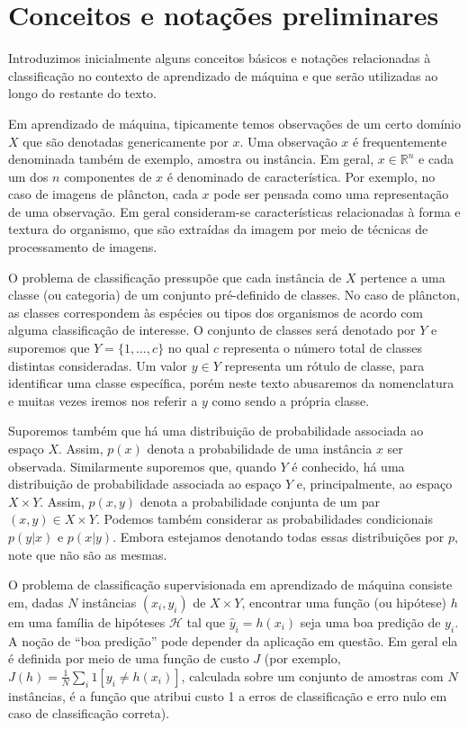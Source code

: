 {\color{black}
\section{Conceitos e notações preliminares}

Introduzimos inicialmente alguns conceitos básicos e notações relacionadas à classificação no contexto de aprendizado de máquina e que serão utilizadas ao longo do restante do texto.

Em aprendizado de máquina, tipicamente temos observações de um certo domínio $X$ que são denotadas genericamente por $x$. Uma observação $x$ é frequentemente denominada também de exemplo, amostra ou instância. Em geral, $x \in \mathbb{R}^n$ e cada um dos $n$ componentes de $x$ é denominado de característica. Por exemplo, no caso de imagens de plâncton, cada $x$ pode ser pensada como uma representação de uma observação. Em geral consideram-se características relacionadas à forma e textura do organismo, que são extraídas da imagem por meio de técnicas de processamento de imagens.

O problema de classificação pressupõe que cada instância de $X$ pertence a uma classe (ou categoria) de um conjunto pré-definido de classes. No caso de plâncton, as classes correspondem às espécies ou tipos dos organismos de acordo com alguma classificação de interesse. O conjunto de classes será denotado por $Y$ e suporemos que $Y=\{1,\ldots,c\}$ no qual $c$ representa o número total de classes distintas consideradas. Um valor $y \in Y$ representa um rótulo de classe, para identificar uma classe específica, porém neste texto abusaremos da nomenclatura e muitas vezes iremos nos referir a $y$ como sendo a própria classe.

Suporemos também que há uma distribuição de probabilidade associada ao espaço $X$. Assim, $p(x)$ denota a probabilidade de uma instância $x$ ser observada. Similarmente suporemos que, quando $Y$ é conhecido, há uma distribuição de probabilidade associada ao espaço $Y$ e, principalmente, ao espaço $X \times Y$. Assim, $p(x,y)$ denota a probabilidade conjunta de um par $(x,y) \in X \times Y$. Podemos também considerar as probabilidades condicionais $p(y|x)$ e $p(x|y)$. Embora estejamos denotando todas essas distribuições por $p$, note que não são as mesmas.

O problema de classificação supervisionada em aprendizado de máquina consiste em, dadas $N$ instâncias $(x_i,y_i)$ de $X \times Y$, encontrar uma função (ou hipótese) $h$ em uma família de hipóteses $\mathcal{H}$ tal que $\hat{y}_i = h(x_i)$ seja uma boa predição de $y_i$. A noção de ``boa predição'' pode depender da aplicação em questão. Em geral ela é definida por meio de uma função de custo $J$ (por exemplo, $J(h) = \frac{1}{N}\sum_i 1[y_i \neq h(x_i)]$, calculada sobre um conjunto de amostras com $N$ instâncias,  é a função que atribui custo 1 a erros de classificação e erro nulo em caso de classificação correta).

}

